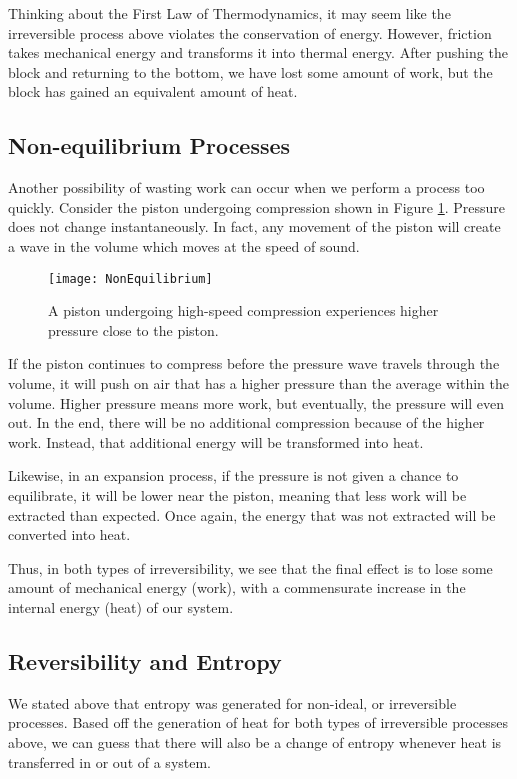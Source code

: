 Thinking about the First Law of Thermodynamics, it may seem like the irreversible process above violates the conservation of energy.  However, friction takes mechanical energy and transforms it into thermal energy.  After pushing the block and returning to the bottom, we have lost some amount of work, but the block has gained an equivalent amount of heat.

\subsection{Non-equilibrium Processes}
Another possibility of wasting work can occur when we perform a process too quickly.  Consider the piston undergoing compression shown in Figure \ref{fig:reversibility}.  Pressure does not change instantaneously.  In fact, any movement of the piston will create a wave in the volume which moves at the speed of sound.

\begin{figure}[H]
  \centering
  \texttt{[image: NonEquilibrium]}
  \caption{A piston undergoing high-speed compression experiences higher pressure close to the piston.}
  \label{fig:reversibility}
\end{figure}

If the piston continues to compress before the pressure wave travels through the volume, it will push on air that has a higher pressure than the average within the volume.  Higher pressure means more work, but eventually, the pressure will even out. In the end, there will be no additional compression because of the higher work.  Instead, that additional energy will be transformed into heat.

Likewise, in an expansion process, if the pressure is not given a chance to equilibrate, it will be lower near the piston, meaning that less work will be extracted than expected.  Once again, the energy that was not extracted will be converted into heat.

Thus, in both types of irreversibility, we see that the final effect is to lose some amount of mechanical energy (work), with a commensurate increase in the internal energy (heat) of our system.

\subsection{Reversibility and Entropy} \label{sec:reversibilityEntropy}
We stated above that entropy was generated for non-ideal, or irreversible processes.  Based off the generation of heat for both types of irreversible processes above, we can guess that there will also be a change of entropy whenever heat is transferred in or out of a system.

